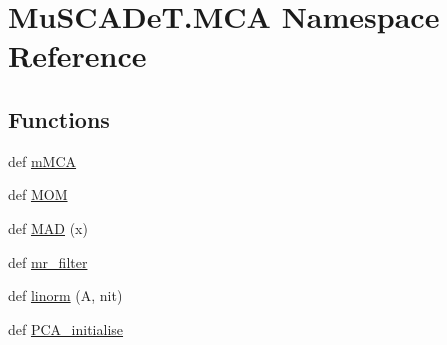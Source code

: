 \hypertarget{namespace_mu_s_c_a_de_t_1_1_m_c_a}{}\section{Mu\+S\+C\+A\+De\+T.\+M\+C\+A Namespace Reference}
\label{namespace_mu_s_c_a_de_t_1_1_m_c_a}
\subsection*{Functions}
\begin{DoxyCompactItemize}
\item 
def \hyperlink{namespace_mu_s_c_a_de_t_1_1_m_c_a_a4f7fc0d484a5fc63cf7a6d81b8f0ae26}{m\+M\+C\+A}
\item 
def \hyperlink{namespace_mu_s_c_a_de_t_1_1_m_c_a_ab81f5d7ea9c605e6632a3f252bea375f}{M\+O\+M}
\item 
def \hyperlink{namespace_mu_s_c_a_de_t_1_1_m_c_a_a74fe6e2957c6f2bf51abcca7b79882bf}{M\+A\+D} (x)
\item 
def \hyperlink{namespace_mu_s_c_a_de_t_1_1_m_c_a_a3bb3a5d4b3e1c019f23a803c6f4a22a9}{mr\+\_\+filter}
\item 
def \hyperlink{namespace_mu_s_c_a_de_t_1_1_m_c_a_a45978bc55d2ad7e70f3cad02f8ce6d8d}{linorm} (A, nit)
\item 
def \hyperlink{namespace_mu_s_c_a_de_t_1_1_m_c_a_a93930e3969fa870fb23d7e9595038ede}{P\+C\+A\+\_\+initialise}
\end{DoxyCompactItemize}
